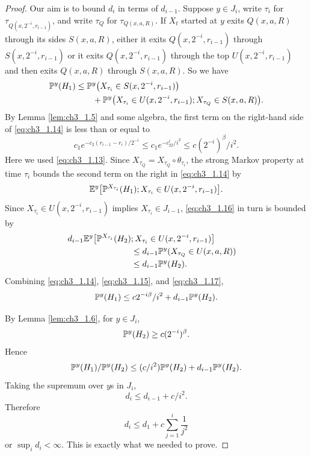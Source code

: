 \begin{proof}
Our aim is to bound $d_i$ in terms of $d_{i-1}$. Suppose $y \in J_i$, write $\tau_i$ for $\tau_{Q(x,2^{-i},r_{i-1})}$, and write $\tau_Q$ for $\tau_{Q(x,a,R)}$. If $X_t$ started at $y$ exits $Q(x,a,R)$ through its sides $S(x,a,R)$, either it exits $Q(x,2^{-i},r_{i-1})$ through $S(x,2^{-i},r_{i-1})$ or it exits $Q(x,2^{-i},r_{i-1})$ through the top $U(x,2^{-i},r_{i-1})$ and then exits $Q(x,a,R)$ through $S(x,a,R)$. So we have
\begin{align}\label{eq:ch3_1.14}
    \P^y(H_1) &\leq \P^y\big(X_{\tau_i} \in S(x,2^{-i},r_{i-1})\big) \\
    &\qquad+ \P^y\big(X_{\tau_i} \in U(x,2^{-i},r_{i-1}); X_{\tau_Q} \in S(x,a,R)\big). \notag
\end{align}
By Lemma \ref{lem:ch3_1.5} and some algebra, the first term on the right-hand side of \eqref{eq:ch3_1.14} is less than or equal to
\begin{equation}\label{eq:ch3_1.15}
    c_1e^{-c_2(r_{i-1}-r_i)/2^{-i}} \leq c_1e^{-c_22^i/i^2} \leq c(2^{-i})^\beta/i^2.
\end{equation}
Here we used \eqref{eq:ch3_1.13}. Since $X_{\tau_Q} = X_{\tau_Q} \circ \theta_{\tau_i}$, the strong Markov property at time $\tau_i$ bounds the second term on the right in \eqref{eq:ch3_1.14} by
\begin{equation}\label{eq:ch3_1.16}
    \E^y\big[\P^{X_{\tau_i}}(H_1); X_{\tau_i} \in U(x,2^{-i},r_{i-1})\big].
\end{equation}
Since $X_{\tau_i} \in U(x,2^{-i},r_{i-1})$ implies $X_{\tau_i} \in J_{i-1}$, \eqref{eq:ch3_1.16} in turn is bounded by
\begin{align}\label{eq:ch3_1.17}
    d_{i-1}\E^y\big[\P^{X_{\tau_i}}(H_2)&; X_{\tau_i} \in U(x,2^{-i},r_{i-1})\big] \\
    &\leq d_{i-1}\P^y(X_{\tau_Q} \in U(x,a,R)) \notag \\
    &\leq d_{i-1}\P^y(H_2). \notag&
\end{align}
Combining \eqref{eq:ch3_1.14}, \eqref{eq:ch3_1.15}, and \eqref{eq:ch3_1.17},
\[
    \P^y(H_1)\le c2^{-i\beta}/i^2 + d_{i-1}\P^y(H_2).
\]

By Lemma \ref{lem:ch3_1.6}, for $y \in J_i$,
\[
    \P^y(H_2) \geq c(2^{-i})^\beta.
\]
Hence
\[
    \P^y(H_1)/\P^y(H_2) \leq (c/i^2)\P^y(H_2) + d_{i-1}\P^y(H_2).
\]
Taking the supremum over $y$s in $J_i$,
\[
    d_i \leq d_{i-1} + c/i^2.
\]
Therefore
\[
    d_i \leq d_1 + c\sum_{j=1}^i \frac{1}{j^2}
\]
or $\sup_i d_i < \infty$. This is exactly what we needed to prove.
\end{proof}

